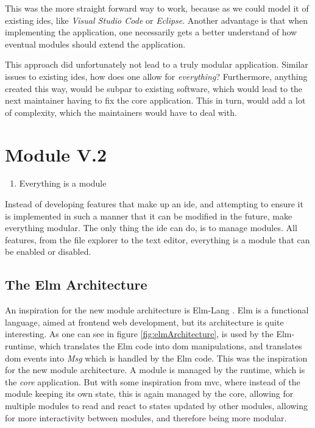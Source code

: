 This was the more straight forward way to work, because as we could model it of
existing \gls{ide}s, like \textit{Visual Studio Code} or \textit{Eclipse}.
Another advantage is that when implementing the application, one necessarily
gets a better understand of how eventual modules should extend the application.

This approach did unfortunately not lead to a truly modular application. Similar
issues to existing \gls{ide}s, how does one allow for \textit{everything}?
Furthermore, anything created this way, would be subpar to existing software,
which would lead to the next maintainer having to fix the core application. This
in turn, would add a lot of complexity, which the maintainers would have to deal with.

\section{Module V.2} \label{sec:mod2}

\begin{enumerate}
  \item Everything is a module
\end{enumerate}

Instead of developing features that make up an \gls{ide}, and attempting to
ensure it is implemented in such a manner that it can be modified in the future,
make everything modular. The only thing the \gls{ide} can do, is to manage
modules. All features, from the file explorer to the text editor, everything is
a module that can be enabled or disabled.

\subsection{The Elm Architecture}

An inspiration for the new module architecture is Elm-Lang \cite{elmLang}. Elm
is a functional language, aimed at frontend web development, but its
architecture is quite interesting. As one can see in figure
\ref{fig:elmArchitecture}, is used by the Elm-runtime, which translates the Elm
code into \gls{dom} manipulations, and translates \gls{dom} events into
\textit{Msg} which is handled by the Elm code. This was the inspiration for the
new module architecture. A module is managed by the runtime, which is the
\textit{core} application. But with some inspiration from \gls{mvc}, where
instead of the module keeping its own state, this is again managed by the core,
allowing for multiple modules to read and react to states updated by other
modules, allowing for more interactivity between modules, and therefore being
more modular.

